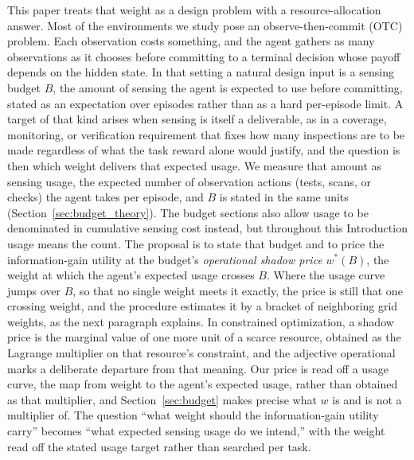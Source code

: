 This paper treats that weight as a design problem with a resource-allocation answer. Most of the environments we study pose an observe-then-commit (OTC) problem. Each observation costs something, and the agent gathers as many observations as it chooses before committing to a terminal decision whose payoff depends on the hidden state. In that setting a natural design input is a sensing budget $B$, the amount of sensing the agent is expected to use before committing, stated as an expectation over episodes rather than as a hard per-episode limit. A target of that kind arises when sensing is itself a deliverable, as in a coverage, monitoring, or verification requirement that fixes how many inspections are to be made regardless of what the task reward alone would justify, and the question is then which weight delivers that expected usage. We measure that amount as sensing usage, the expected number of observation actions (tests, scans, or checks) the agent takes per episode, and $B$ is stated in the same units (Section~\ref{sec:budget_theory}). The budget sections also allow usage to be denominated in cumulative sensing cost instead, but throughout this Introduction usage means the count. The proposal is to state that budget and to price the information-gain utility at the budget's \emph{operational shadow price} $w^*(B)$, the weight at which the agent's expected usage crosses $B$. Where the usage curve jumps over $B$, so that no single weight meets it exactly, the price is still that one crossing weight, and the procedure estimates it by a bracket of neighboring grid weights, as the next paragraph explains. In constrained optimization, a shadow price is the marginal value of one more unit of a scarce resource, obtained as the Lagrange multiplier on that resource's constraint, and the adjective operational marks a deliberate departure from that meaning. Our price is read off a usage curve, the map from weight to the agent's expected usage, rather than obtained as that multiplier, and Section~\ref{sec:budget} makes precise what $w$ is and is not a multiplier of. The question ``what weight should the information-gain utility carry'' becomes ``what expected sensing usage do we intend,'' with the weight read off the stated usage target rather than searched per task.

